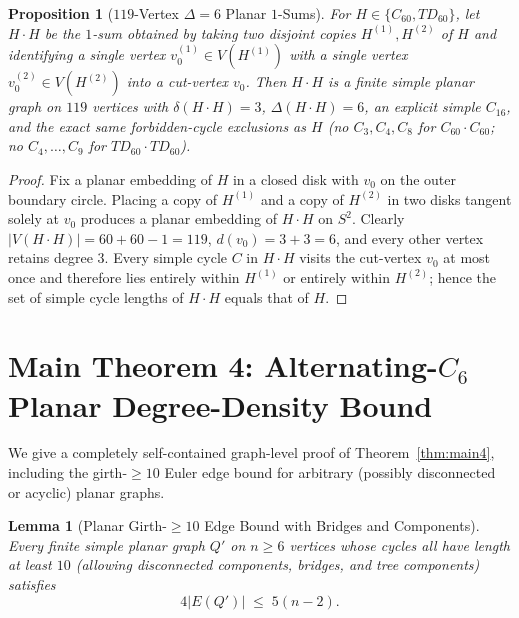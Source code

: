 \documentclass[11pt,reqno]{amsart}
\theoremstyle{plain}
\newtheorem{lemma}[theorem]{Lemma}
\newtheorem{proposition}[theorem]{Proposition}
\theoremstyle{definition}
\theoremstyle{remark}
\DeclareRobustCommand{\_}{\ifmmode\text{\textunderscore}\else\textunderscore\allowbreak\fi}
\begin{document}
\begin{proposition}[$119$-Vertex $\Delta = 6$ Planar $1$-Sums]\label{prop:1sum}
For $H \in \{C_{60}, TD_{60}\}$, let $H \cdot H$ be the $1$-sum obtained by taking two disjoint copies $H^{(1)}, H^{(2)}$ of $H$ and identifying a single vertex $v_0^{(1)} \in V(H^{(1)})$ with a single vertex $v_0^{(2)} \in V(H^{(2)})$ into a cut-vertex $v_0$. Then $H \cdot H$ is a finite simple planar graph on $119$ vertices with $\delta(H \cdot H) = 3$, $\Delta(H \cdot H) = 6$, an explicit simple $C_{16}$, and the exact same forbidden-cycle exclusions as $H$ (no $C_3, C_4, C_8$ for $C_{60} \cdot C_{60}$; no $C_4,\dots,C_9$ for $TD_{60} \cdot TD_{60}$).
\end{proposition}

\begin{proof}
Fix a planar embedding of $H$ in a closed disk with $v_0$ on the outer boundary circle. Placing a copy of $H^{(1)}$ and a copy of $H^{(2)}$ in two disks tangent solely at $v_0$ produces a planar embedding of $H \cdot H$ on $S^2$. Clearly $|V(H \cdot H)| = 60 + 60 - 1 = 119$, $d(v_0) = 3 + 3 = 6$, and every other vertex retains degree $3$. Every simple cycle $C$ in $H \cdot H$ visits the cut-vertex $v_0$ at most once and therefore lies entirely within $H^{(1)}$ or entirely within $H^{(2)}$; hence the set of simple cycle lengths of $H \cdot H$ equals that of $H$.
\end{proof}

\section{Main Theorem 4: Alternating-\texorpdfstring{$C_6$}{C6} Planar Degree-Density Bound}\label{sec:density}

We give a completely self-contained graph-level proof of Theorem~\ref{thm:main4}, including the girth-$\ge 10$ Euler edge bound for arbitrary (possibly disconnected or acyclic) planar graphs.

\begin{lemma}[Planar Girth-$\ge 10$ Edge Bound with Bridges and Components]\label{lem:girth10-general}
Every finite simple planar graph $Q'$ on $n \ge 6$ vertices whose cycles all have length at least $10$ (allowing disconnected components, bridges, and tree components) satisfies
\begin{equation}\label{eq:girth10-bound}
  4 |E(Q')| \;\le\; 5(n - 2).
\end{equation}
\end{lemma}
\end{document}
